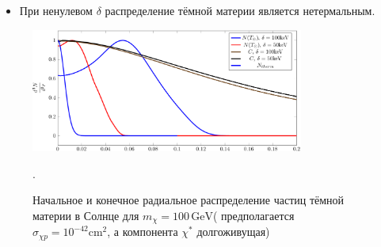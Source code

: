 \begin{itemize}
	\item При ненулевом $\delta$ распределение тёмной материи является нетермальным.
\end{itemize}
\begin{figure}[!h]
	\centering
	\includegraphics[width=0.8\textwidth]{images/Rdistribs.png}
	\caption{Начальное и конечное радиальное распределение частиц тёмной материи в Солнце для $m_{\chi} = 100 \, \text{GeV}$( предполагается $\sigma_{\chi p} = 10^{-42} \text{cm}^2$, а компонента $\chi^*$ долгоживущая)}.
	\label{plot:Nrdistrib}
\end{figure}
